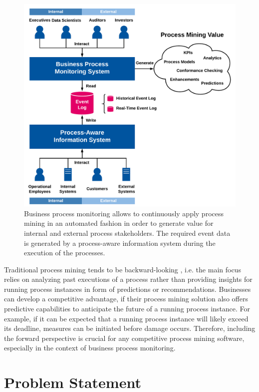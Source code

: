 \begin{figure}[tbp!]
	\centering
	\includegraphics[width=\textwidth]{figures/process-monitoring}
	\caption[Process mining in the context of business process monitoring]{Business process monitoring allows to continuously apply process mining in an automated fashion in order to generate value for internal and external process stakeholders. The required event data is generated by a process-aware information system during the execution of the processes.}
	\label{fig:process-monitoring}
\end{figure}

Traditional process mining tends to be backward-looking \cite{DBLP:conf/scsc/Aalst18}, i.e. the main focus relies on analyzing past executions of a process rather than providing insights for running process instances in form of predictions or recommendations.
Businesses can develop a competitive advantage, if their process mining solution also offers predictive capabilities to anticipate the future of a running process instance.
For example, if it can be expected that a running process instance will likely exceed its deadline, measures can be initiated before damage occurs.
Therefore, including the forward perspective is crucial for any competitive process mining software, especially in the context of business process monitoring.

\section{Problem Statement}

